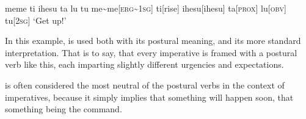 \ex
\begingl
\glpreamble meme ti ihesu ta lu tu
\endpreamble
me\textasciitilde me[\textsc{erg\textasciitilde1sg}]
ti[rise]
ihesu[ihesu]
ta[\textsc{prox}]
lu[\textsc{obv}]
tu[\textsc{2sg}]
\glft `Get up!'
\endgl
\xe

In this example,  is used both with its postural meaning, and its more standard interpretation.
That is to say, that every imperative is framed with a postural verb like this, each imparting slightly different urgencies and expectations.

 is often considered the most neutral of the postural verbs in the context of imperatives, because it simply implies that something will happen soon, that something being the command.